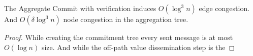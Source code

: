 \begin{theorem}
\cite{chan2006secure}
The Aggregate Commit with verification induces $O(\log^3 n)$ edge congestion. And $O(\delta\log^3 n)$ node congestion in the aggregation tree.
\end{theorem}
\begin{proof}
	While creating the commitment tree every sent message is at most $O(\log n)$ size.
	And while the off-path value dissemination step is the
\end{proof}